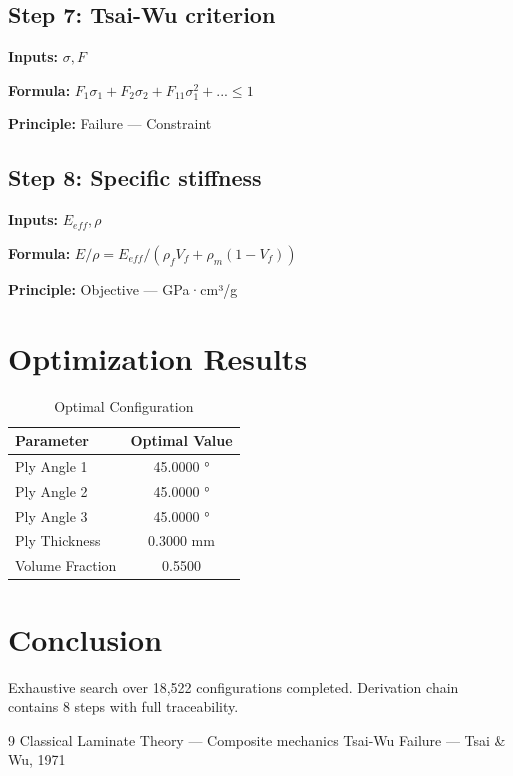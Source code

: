 \documentclass[11pt,twocolumn]{article}
\begin{document}
\subsection*{Step 7: Tsai-Wu criterion}
\textbf{Inputs:} $\sigma, F$

\textbf{Formula:} $F_1\sigma_1 + F_2\sigma_2 + F_{11}\sigma_1^2 + ... \leq 1$

\textbf{Principle:} Failure --- Constraint

\subsection*{Step 8: Specific stiffness}
\textbf{Inputs:} $E_{eff}, \rho$

\textbf{Formula:} $E/\rho = E_{eff}/(\rho_f V_f + \rho_m(1-V_f))$

\textbf{Principle:} Objective --- GPa·cm³/g


\section{Optimization Results}
\begin{table}[h]
\centering
\caption{Optimal Configuration}
\begin{tabular}{@{}lc@{}}
\toprule
Parameter & Optimal Value \\
\midrule
Ply Angle 1 & 45.0000 ° \\
Ply Angle 2 & 45.0000 ° \\
Ply Angle 3 & 45.0000 ° \\
Ply Thickness & 0.3000 mm \\
Volume Fraction & 0.5500  \\
\bottomrule
\end{tabular}
\end{table}

\section{Conclusion}
Exhaustive search over 18,522 configurations completed.
Derivation chain contains 8 steps with full traceability.

\begin{thebibliography}{9}
 Classical Laminate Theory --- Composite mechanics
 Tsai-Wu Failure --- Tsai & Wu, 1971
\end{thebibliography}
\end{document}
